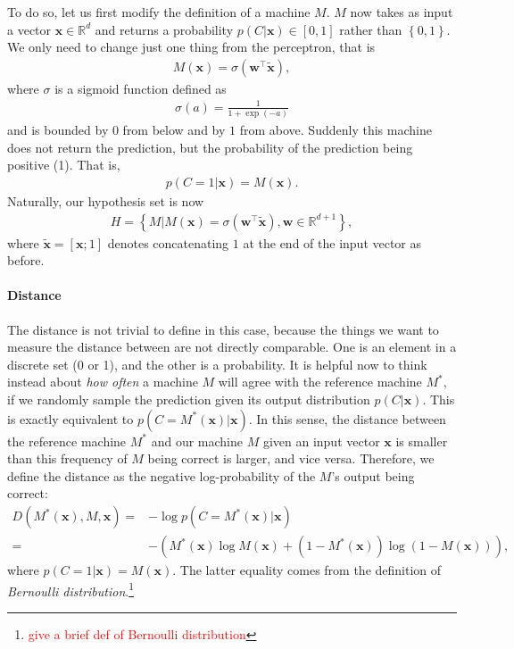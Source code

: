 \documentclass{report}
\newcommand{\vect}[1]{\mathbf{#1}}
\newcommand{\vx}[0]{\vect{x}}
\newcommand{\vw}[0]{\vect{w}}
\newcommand{\sigmoid}{\sigma}
\newcommand{\todo}[1]{{\Large\textcolor{red}{#1}}}
\begin{document}
To do so, let us first modify the definition of a machine $M$. $M$ now takes as
input a vector $\vx \in \mathbb{R}^d$ and returns a probability $p(C|\vx) \in
\left[ 0, 1\right]$ rather than $\left\{ 0, 1\right\}$. We only need to change
just one thing from the perceptron, that is
\begin{align}
    \label{eq:logreg}
    M(\vx) = \sigmoid(\vw^\top \tilde{\vx}),
\end{align}
where $\sigmoid$ is a sigmoid function defined as
\begin{align*}
    \sigmoid(a) = \frac{1}{1 + \exp(-a)}
\end{align*}
and is bounded by $0$ from below and by $1$ from above. Suddenly this machine
does not return the prediction, but the probability of the prediction being
positive (1). That is,
\begin{align*}
    p(C=1|\vx) = M(\vx).
\end{align*}
Naturally, our hypothesis set is now
\begin{align*}
    H = \left\{ 
    M | M(\vx) = \sigmoid(\vw^\top \tilde{\vx}), \vw \in \mathbb{R}^{d+1}
    \right\},
\end{align*}
where $\tilde{\vx} = \left[ \vx; 1\right]$ denotes concatenating $1$ at the end
of the input vector as before. 

\paragraph{Distance}

The distance is not trivial to define in this case, because the things we want
to measure the distance between are not directly comparable. One is an element
in a discrete set (0 or 1), and the other is a probability. It is helpful now to
think instead about {\it how often} a machine $M$ will agree with the reference
machine $M^*$, if we randomly sample the prediction given its output
distribution $p(C|\vx)$. This is exactly equivalent to $p(C=M^*(\vx)|\vx)$. In
this sense, the distance between the reference machine $M^*$ and our machine $M$
given an input vector $\vx$ is smaller than this frequency of $M$ being correct
is larger, and vice versa. Therefore, we define the distance as the negative
log-probability of the $M$'s output being correct:
\begin{align}
    \label{eq:logreg_dist}
    D(M^*(\vx), M, \vx) =& -\log p(C=M^*(\vx) | \vx) \\
    =& -(M^*(\vx) \log M(\vx) + (1-M^*(\vx)) \log (1- M(\vx))),
    \nonumber
\end{align}
where $p(C=1|\vx) = M(\vx)$. The latter equality comes from the definition of
{\it Bernoulli distribution}.\footnote{
    \todo{give a brief def of Bernoulli distribution}
}
\end{document}
